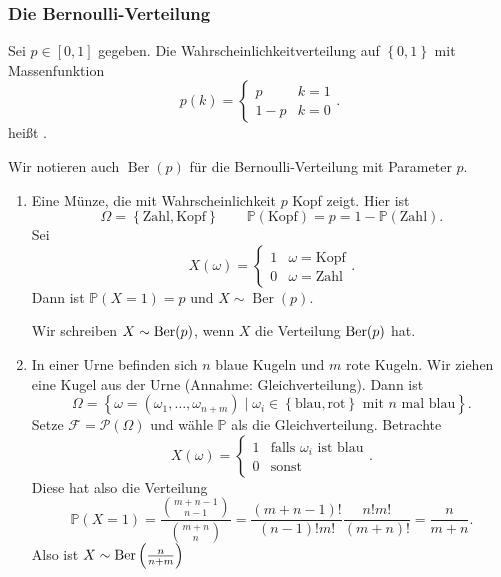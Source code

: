 \subsubsection{Die Bernoulli-Verteilung}
\begin{definition}
    Sei $p\in [0,1]$ gegeben. Die Wahrscheinlichkeitverteilung auf $\left \{0,1\right\} $ mit Massenfunktion
    \[
        p(k) = \begin{cases}
            p & k = 1 \\
            1-p & k = 0
        \end{cases}
    .\] 
        heißt . 
\end{definition}
\begin{notation}
    Wir notieren auch $\operatorname{Ber} (p)$ für die Bernoulli-Verteilung mit Parameter $p$.
\end{notation}
\begin{example}
    \begin{enumerate}[label=\protect\circled{\alph*}]
        \item Eine Münze, die mit Wahrscheinlichkeit $p$ Kopf zeigt. Hier ist
             \[
                 \Omega = \left \{\text{Zahl}, \text{Kopf}\right\} \qquad \mathbb{P}(\text{Kopf}) = p = 1-\mathbb{P}(\text{Zahl})
            .\] 
            Sei
            \[
                X(\omega) = \begin{cases}
                    1 & \omega = \text{Kopf} \\
                    0 & \omega = \text{Zahl}
                \end{cases}
            .\] 
            Dann ist $\mathbb{P}(X = 1) = p$ und $X \sim  \operatorname{Ber} (p)$.
            \begin{notation}
                Wir schreiben $X \sim \operatorname{Ber}(p)$, wenn $X$ die Verteilung  $\operatorname{Ber}(p)$ hat.
            \end{notation}
        \item In einer Urne befinden sich $n$ blaue Kugeln und  $m$ rote Kugeln. Wir ziehen eine Kugel aus der Urne (Annahme: Gleichverteilung). Dann ist
            \[
                \Omega = \left \{\omega = (\omega_1,\ldots,\omega_{n+m}) \mid \omega_i \in  \left \{\text{blau},\text{rot}\right\} \text{ mit $n$ mal blau} \right\} 
            .\] 
            Setze $\mathcal{F}= \mathcal{P}(\Omega)$ und wähle $\mathbb{P}$ als die Gleichverteilung. Betrachte
            \[
                X(\omega) = \begin{cases}
                    1 & \text{falls $\omega_i$ ist blau} \\
                    0 & \text{sonst}
                \end{cases}
            .\] 
Diese hat also die Verteilung
\[
    \mathbb{P}(X = 1) = \frac{\binom{m+n-1}{n-1}}{\binom{m+n}{n}} = \frac{(m+n-1)!}{(n-1)! m!} \frac{n! m!}{(m+n)!} = \frac{n}{m+n}
.\] 
Also ist $X \sim \operatorname{Ber}\left( \frac{n}{n+m} \right) $
    \end{enumerate}
\end{example}

